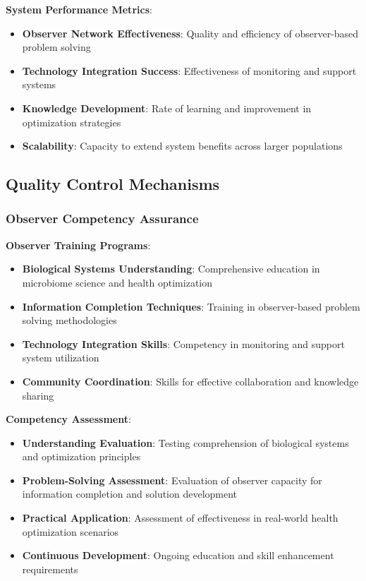 \documentclass[12pt,a4paper]{article}
\begin{document}
\textbf{System Performance Metrics}:
\begin{itemize}
\item \textbf{Observer Network Effectiveness}: Quality and efficiency of observer-based problem solving
\item \textbf{Technology Integration Success}: Effectiveness of monitoring and support systems
\item \textbf{Knowledge Development}: Rate of learning and improvement in optimization strategies
\item \textbf{Scalability}: Capacity to extend system benefits across larger populations
\end{itemize}

\subsection{Quality Control Mechanisms}

\subsubsection{Observer Competency Assurance}

\textbf{Observer Training Programs}:
\begin{itemize}
\item \textbf{Biological Systems Understanding}: Comprehensive education in microbiome science and health optimization
\item \textbf{Information Completion Techniques}: Training in observer-based problem solving methodologies
\item \textbf{Technology Integration Skills}: Competency in monitoring and support system utilization
\item \textbf{Community Coordination}: Skills for effective collaboration and knowledge sharing
\end{itemize}

\textbf{Competency Assessment}:
\begin{itemize}
\item \textbf{Understanding Evaluation}: Testing comprehension of biological systems and optimization principles
\item \textbf{Problem-Solving Assessment}: Evaluation of observer capacity for information completion and solution development
\item \textbf{Practical Application}: Assessment of effectiveness in real-world health optimization scenarios
\item \textbf{Continuous Development}: Ongoing education and skill enhancement requirements
\end{itemize}
\end{document}
